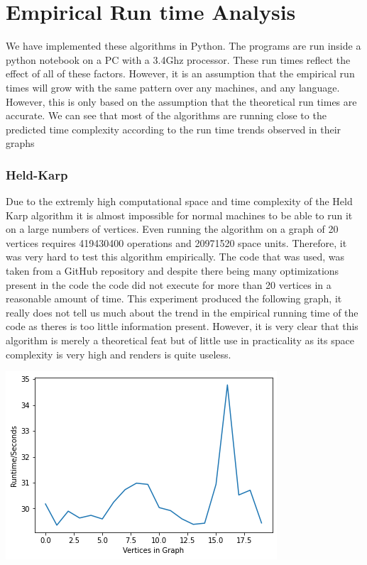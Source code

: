 \documentclass[12pt]{report}
\begin{document}
\chapter{Empirical Run time Analysis}
We have implemented these algorithms in Python. The programs are run inside a python notebook on a PC with a 3.4Ghz processor. These run times reflect the effect of all of these factors. However, it is an assumption that the empirical run times will grow with the same pattern over any machines, and any language. However, this is only based on the assumption that the theoretical run times are accurate. We can see that most of the algorithms are running close to the predicted time complexity according to the run time trends observed in their graphs

\subsection{Held-Karp}
Due to the extremly high computational space and time complexity of the Held Karp algorithm it is almost impossible for normal machines to be able to run it on a large numbers of vertices. Even running the algorithm on a graph of 20 vertices requires 419430400 operations and 20971520 space units. Therefore, it was very hard to test this algorithm empirically. The code that was used, was taken from a GitHub repository and despite there being many optimizations present in the code the code did not execute for more than 20 vertices in a reasonable amount of time. This experiment produced the following graph, it really does not tell us much about the trend in the empirical running time of the code as theres is too little information present. However, it is very clear that this algorithm is merely a theoretical feat but of little use in practicality as its space complexity is very high and renders is quite useless.  
\begin{center}
    \includegraphics[scale = 0.75]{images/heldkarp.png}
\end{center}
\end{document}
